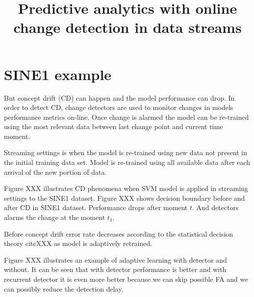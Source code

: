 \documentclass[12 pt]{article}
\title{Predictive analytics with online change detection in data streams}
\date{}
\begin{document}
	\maketitle
  \section{SINE1 example}
  But concept drift (CD) can happen and the model performance can drop. In
  order to detect CD, change detectors are used to monitor changes in models
  performance metrics on-line. Once change is alarmed the model can be
  re-trained using the most relevant data between last change point and current
  time moment.

  Streaming settings is when the model is re-trained using new data not present
  in the initial training data set. Model is re-trained using all available
  data after each arrival of the new portion of data.  

  Figure XXX illustrates
  CD phenomena when SVM model is applied in streaming settings to the SINE1
  dataset. Figure XXX shows decision boundary before and after CD in SINE1
  dataset. Performance drops after moment $t$. And detectors alarms the change
  at the moment $t_1$.
  
  Before concept drift error rate decreases according to the statistical decision theory cite{XXX} as model is adaptively retrained.

  Figure XXX illustrates an example of adaptive learning with detector and
  without. It can be seen that with detector performance is better and with
  recurrent detector it is even more better because we can skip possible FA and
  we can possibly reduce the detection delay.
\end{document}
